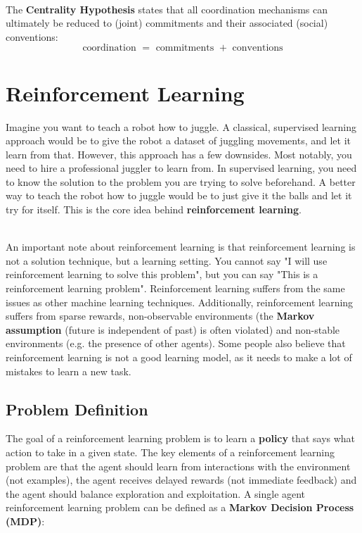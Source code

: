 \documentclass[12pt]{article}
\begin{document}
\noindent
\\
The \textbf{Centrality Hypothesis} states that all coordination mechanisms can ultimately be reduced to (joint) commitments and their associated (social) conventions:
\[ \text{coordination } = \text{ commitments } + \text{ conventions} \]

%
%
\newpage
\section{Reinforcement Learning}
Imagine you want to teach a robot how to juggle.
A classical, supervised learning approach would be to give the robot a dataset of juggling movements, and let it learn from that.
However, this approach has a few downsides.
Most notably, you need to hire a professional juggler to learn from.
In supervised learning, you need to know the solution to the problem you are trying to solve beforehand.
A better way to teach the robot how to juggle would be to just give it the balls and let it try for itself.
This is the core idea behind \textbf{reinforcement learning}.

\noindent
\\
An important note about reinforcement learning is that reinforcement learning is not a solution technique, but a learning setting.
You cannot say "I will use reinforcement learning to solve this problem", but you can say "This is a reinforcement learning problem".
Reinforcement learning suffers from the same issues as other machine learning techniques.
Additionally, reinforcement learning suffers from sparse rewards, non-observable environments (the \textbf{Markov assumption} (future is independent of past) is often violated) and non-stable environments (e.g. the presence of other agents).
Some people also believe that reinforcement learning is not a good learning model, as it needs to make a lot of mistakes to learn a new task.

\subsection{Problem Definition}
The goal of a reinforcement learning problem is to learn a \textbf{policy} that says what action to take in a given state.
The key elements of a reinforcement learning problem are that the agent should learn from interactions with the environment (not examples), the agent receives delayed rewards (not immediate feedback) and the agent should balance exploration and exploitation.
A single agent reinforcement learning problem can be defined as a \textbf{Markov Decision Process (MDP)}:
\end{document}
